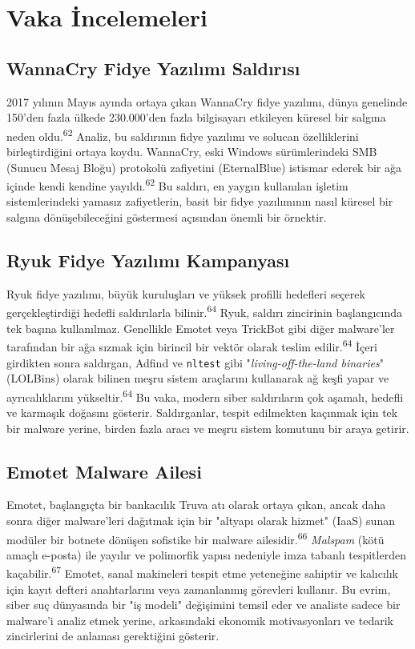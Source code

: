 \section{Vaka İncelemeleri}

\subsection{WannaCry Fidye Yazılımı Saldırısı}

2017 yılının Mayıs ayında ortaya çıkan WannaCry fidye yazılımı, dünya genelinde 150'den fazla ülkede 230.000'den fazla bilgisayarı etkileyen küresel bir salgına neden oldu.\textsuperscript{62} Analiz, bu saldırının fidye yazılımı ve solucan özelliklerini birleştirdiğini ortaya koydu. WannaCry, eski Windows sürümlerindeki SMB (Sunucu Mesaj Bloğu) protokolü zafiyetini (EternalBlue) istismar ederek bir ağa içinde kendi kendine yayıldı.\textsuperscript{62} Bu saldırı, en yaygın kullanılan işletim sistemlerindeki yamasız zafiyetlerin, basit bir fidye yazılımının nasıl küresel bir salgına dönüşebileceğini göstermesi açısından önemli bir örnektir.

\subsection{Ryuk Fidye Yazılımı Kampanyası}

Ryuk fidye yazılımı, büyük kuruluşları ve yüksek profilli hedefleri seçerek gerçekleştirdiği hedefli saldırılarla bilinir.\textsuperscript{64} Ryuk, saldırı zincirinin başlangıcında tek başına kullanılmaz. Genellikle Emotet veya TrickBot gibi diğer malware'ler tarafından bir ağa sızmak için birincil bir vektör olarak teslim edilir.\textsuperscript{64} İçeri girdikten sonra saldırgan, Adfind ve \texttt{nltest} gibi "\textit{living-off-the-land binaries}" (LOLBins) olarak bilinen meşru sistem araçlarını kullanarak ağ keşfi yapar ve ayrıcalıklarını yükseltir.\textsuperscript{64} Bu vaka, modern siber saldırıların çok aşamalı, hedefli ve karmaşık doğasını gösterir. Saldırganlar, tespit edilmekten kaçınmak için tek bir malware yerine, birden fazla aracı ve meşru sistem komutunu bir araya getirir.

\subsection{Emotet Malware Ailesi}

Emotet, başlangıçta bir bankacılık Truva atı olarak ortaya çıkan, ancak daha sonra diğer malware'leri dağıtmak için bir "altyapı olarak hizmet" (IaaS) sunan modüler bir botnete dönüşen sofistike bir malware ailesidir.\textsuperscript{66} \textit{Malspam} (kötü amaçlı e-posta) ile yayılır ve polimorfik yapısı nedeniyle imza tabanlı tespitlerden kaçabilir.\textsuperscript{67} Emotet, sanal makineleri tespit etme yeteneğine sahiptir ve kalıcılık için kayıt defteri anahtarlarını veya zamanlanmış görevleri kullanır. Bu evrim, siber suç dünyasında bir "iş modeli" değişimini temsil eder ve analiste sadece bir malware'i analiz etmek yerine, arkasındaki ekonomik motivasyonları ve tedarik zincirlerini de anlaması gerektiğini gösterir.


